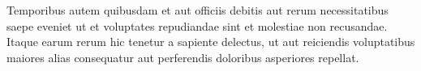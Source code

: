 Temporibus autem quibusdam et aut officiis debitis aut rerum necessitatibus saepe eveniet ut et voluptates repudiandae sint et molestiae non recusandae. Itaque earum rerum hic tenetur a sapiente delectus, ut aut reiciendis voluptatibus maiores alias consequatur aut perferendis doloribus asperiores repellat.

\clearemptydoublepage

